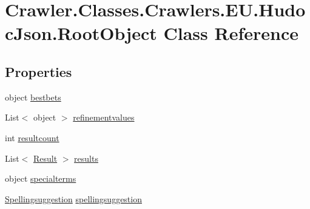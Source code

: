 \hypertarget{class_crawler_1_1_classes_1_1_crawlers_1_1_e_u_1_1_hudoc_json_1_1_root_object}{\section{Crawler.\-Classes.\-Crawlers.\-E\-U.\-Hudoc\-Json.\-Root\-Object Class Reference}
\label{class_crawler_1_1_classes_1_1_crawlers_1_1_e_u_1_1_hudoc_json_1_1_root_object}
}
\subsection*{Properties}
\begin{DoxyCompactItemize}
\item 
object \hyperlink{class_crawler_1_1_classes_1_1_crawlers_1_1_e_u_1_1_hudoc_json_1_1_root_object_af00c1d3c2b7541a9e2b7418fb19f442c}{bestbets}
\item 
List$<$ object $>$ \hyperlink{class_crawler_1_1_classes_1_1_crawlers_1_1_e_u_1_1_hudoc_json_1_1_root_object_acced50950de4b326bd1356a4db370bcc}{refinementvalues}
\item 
int \hyperlink{class_crawler_1_1_classes_1_1_crawlers_1_1_e_u_1_1_hudoc_json_1_1_root_object_ad18bc9a42c85b4bd56eacb5e671a1a22}{resultcount}
\item 
List$<$ \hyperlink{class_crawler_1_1_classes_1_1_crawlers_1_1_e_u_1_1_hudoc_json_1_1_result}{Result} $>$ \hyperlink{class_crawler_1_1_classes_1_1_crawlers_1_1_e_u_1_1_hudoc_json_1_1_root_object_a0449c1427ff5028eaebb3da4510bb8e1}{results}
\item 
object \hyperlink{class_crawler_1_1_classes_1_1_crawlers_1_1_e_u_1_1_hudoc_json_1_1_root_object_a1ca381537d74b7f01e501703369a2fca}{specialterms}
\item 
\hyperlink{class_crawler_1_1_classes_1_1_crawlers_1_1_e_u_1_1_hudoc_json_1_1_spellingsuggestion}{Spellingsuggestion} \hyperlink{class_crawler_1_1_classes_1_1_crawlers_1_1_e_u_1_1_hudoc_json_1_1_root_object_a107406c6da51ecdabf6621fe904eaba6}{spellingsuggestion}
\end{DoxyCompactItemize}



